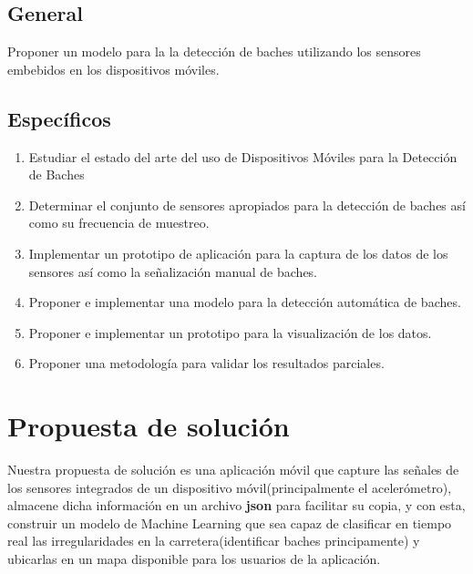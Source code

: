 \subsection*{General}
Proponer un modelo para la la detección de baches utilizando los sensores embebidos en los dispositivos móviles.

\subsection*{Específicos}
\begin{enumerate}
		\item Estudiar el estado del arte del uso de Dispositivos Móviles para la Detección de Baches
		\item Determinar el conjunto de sensores apropiados para la detección de baches así como su 
frecuencia de muestreo. 
		\item Implementar un prototipo de aplicación para la captura de los datos de los sensores así 
como la señalización manual de baches. 
		\item Proponer e implementar una modelo para la detección automática de baches.
		\item Proponer e implementar un prototipo para la visualización de los datos.
		\item Proponer una metodología para validar los resultados parciales.

\end{enumerate}

\section*{Propuesta de solución}

Nuestra propuesta de solución es una aplicación móvil que capture las señales de los sensores integrados de un dispositivo móvil(principalmente el acelerómetro), almacene
dicha información en un archivo \textbf{json} para facilitar su copia, y con esta, construir un modelo de Machine Learning que sea capaz de clasificar en tiempo real las irregularidades en la
carretera(identificar baches principamente) y ubicarlas en un mapa disponible para los usuarios de la aplicación.
